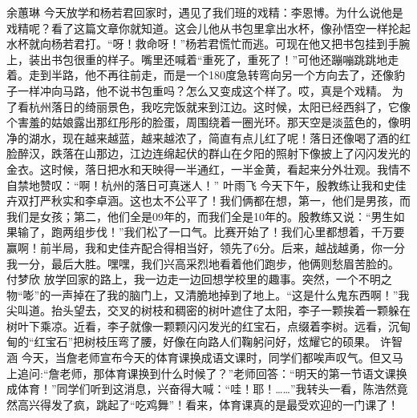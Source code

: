 \markdownRendererDocumentBegin
{}\markdownRendererInterblockSeparator
{}\markdownRendererInterblockSeparator
{}余蕙琳\markdownRendererInterblockSeparator
{}今天放学和杨若君回家时，遇见了我们班的戏精：李恩博。为什么说他是戏精呢？看了这篇文章你就知道。这会儿他从书包里拿出水杯，像孙悟空一样抡起水杯就向杨若君打。“呀！救命呀！”杨若君慌忙而逃。可现在他又把书包挂到手腕上，装出书包很重的样子。嘴里还喊着“重死了，重死了！”可他还蹦嘣跳跳地走着。走到半路，他不再往前走，而是一个180度急转弯向另一个方向去了，还像豹子一样冲向马路，他不说书包重吗？怎么又变成这个样了。哎，真是个戏精。\markdownRendererInterblockSeparator
{}\markdownRendererInterblockSeparator
{}为了看杭州落日的绮丽景色，我吃完饭就来到江边。这时候，太阳已经西斜了，它像个害羞的姑娘露出那红彤彤的脸蛋，周围绕着一圈光环。那天空是淡蓝色的，像明净的湖水，现在越来越蓝，越来越浓了，简直有点儿红了呢！落日还像喝了酒的红脸醉汉，跌落在山那边，江边连绵起伏的群山在夕阳的照射下像披上了闪闪发光的金衣。这时候，落日把水和天映得一半通红，一半金黄，看起来分外壮观。我情不自禁地赞叹：“啊！杭州的落日可真迷人！”\markdownRendererInterblockSeparator
{}\markdownRendererInterblockSeparator
{}叶雨飞\markdownRendererInterblockSeparator
{}今天下午，殷教练让我和史佳卉双打严秋实和李卓涵。这也太不公平了！我们俩都在想，第一，他们是男孩，而我们是女孩；第二，他们全是09年的，而我们全是10年的。殷教练又说：“男生如果输了，跑两组步伐！”我们松了一口气。比赛开始了！我们心里都想着，千万要赢啊！前半局，我和史佳卉配合得相当好，领先了6分。后来，越战越勇，你一分我一分，最后大胜。嘿嘿，我们兴高采烈地看着他们跑步，他俩则愁眉苦脸的。\markdownRendererInterblockSeparator
{}\markdownRendererInterblockSeparator
{}付梦欣\markdownRendererInterblockSeparator
{}放学回家的路上，我一边走一边回想学校里的趣事。突然，一个不明之物“嘭”的一声掉在了我的脑门上，又清脆地掉到了地上。“这是什么鬼东西啊！”我尖叫道。抬头望去，交叉的树枝和稠密的树叶遮住了太阳，李子一颗挨着一颗躲在树叶下乘凉。近看，李子就像一颗颗闪闪发光的红宝石，点缀着李树。远看，沉甸甸的“红宝石”把树枝压弯了腰，好像在向路人们鞠躬问好，炫耀它的硕果。\markdownRendererInterblockSeparator
{}\markdownRendererInterblockSeparator
{}许智涵\markdownRendererInterblockSeparator
{}今天，当詹老师宣布今天的体育课换成语文课时，同学们都唉声叹气。但又马上追问:“詹老师，那体育课换到什么时候了？”老师回答：“明天的第一节语文课换成体育！”同学们听到这消息，兴奋得大喊：“哇！耶！……”我转头一看，陈浩然竟然高兴得发了疯，跳起了“吃鸡舞”！看来，体育课真的是最受欢迎的一门课了！ \markdownRendererInterblockSeparator
